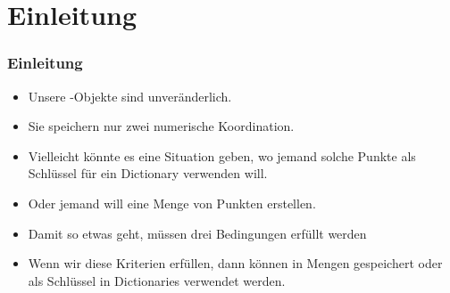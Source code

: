 \documentclass[aspectratio=169,mathserif,notheorems]{beamer}%
\subtitle{44.~Klassen/Dunder:~\texttt{\_\_hash\_\_}}%
\begin{document}
%
%
\startPresentation%
%
\section{Einleitung}%
\begin{frame}[t]%
\frametitle{Einleitung}%
\begin{itemize}%
%
\item Unsere -Objekte sind unveränderlich.%
%
\item<2-> Sie speichern nur zwei numerische Koordination.%
%
\item<3-> Vielleicht könnte es eine Situation geben, wo jemand solche Punkte als Schlüssel für ein Dictionary verwenden will.%
%
\item<4-> Oder jemand will eine Menge von Punkten erstellen.%
%
\item<5-> Damit so etwas geht, müssen drei Bedingungen erfüllt werden%
%
\item<12-> Wenn wir diese Kriterien erfüllen, dann können  in Mengen gespeichert oder als Schlüssel in Dictionaries verwendet werden.%
%
\end{itemize}%
\end{frame}%
%
%
\end{document}
